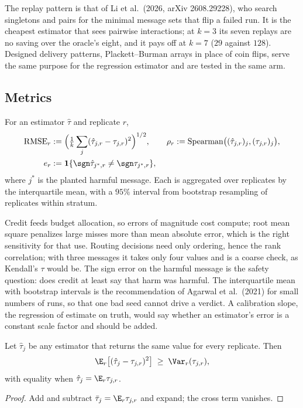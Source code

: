 \documentclass[11pt]{article}
\numberwithin{theorem}{section}
\theoremstyle{definition}
\theoremstyle{problemstyle}
\begin{document}
\begin{remark}
The replay pattern is that of Li et al.\ (2026, arXiv 2608.29228), who search singletons and pairs for the minimal
message sets that flip a failed run. It is the cheapest estimator that sees pairwise interactions; at $k=3$ its seven
replays are no saving over the oracle's eight, and it pays off at $k=7$ ($29$ against $128$). Designed delivery
patterns, Plackett--Burman arrays in place of coin flips, serve the same purpose for the regression estimator and are
tested in the same arm.
\end{remark}

\subsection{Metrics}

\begin{definition}
For an estimator $\hat\tau$ and replicate $r$,
\begin{align*}
\mathrm{RMSE}_r &:= \Big(\tfrac1k\sum_j(\hat\tau_{j,r}-\tau_{j,r})^2\Big)^{1/2}, \qquad
\rho_r := \mathrm{Spearman}\big((\hat\tau_{j,r})_j,(\tau_{j,r})_j\big),\\
e_r &:= \mathbf 1\{\sgn\hat\tau_{j^\ast,r}\neq\sgn\tau_{j^\ast,r}\},
\end{align*}
where $j^\ast$ is the planted harmful message. Each is aggregated over replicates by the interquartile mean, with a
$95\%$ interval from bootstrap resampling of replicates within stratum.
\end{definition}

\begin{remark}
Credit feeds budget allocation, so errors of magnitude cost compute; root mean square penalizes large misses more than
mean absolute error, which is the right sensitivity for that use. Routing decisions need only ordering, hence the rank
correlation; with three messages it takes only four values and is a coarse check, as Kendall's $\tau$ would be. The
sign error on the harmful message is the safety question: does credit at least say that harm was harmful. The
interquartile mean with bootstrap intervals is the recommendation of Agarwal et al.\ (2021) for small numbers of runs,
so that one bad seed cannot drive a verdict. A calibration slope, the regression of estimate on truth, would say whether
an estimator's error is a constant scale factor and should be added.
\end{remark}

\begin{prop}\label{prop:floor}
Let $\hat\tau_j$ be any estimator that returns the same value for every replicate. Then
\[
\E_r\big[(\hat\tau_j-\tau_{j,r})^2\big]\;\ge\;\Var_r(\tau_{j,r}),
\]
with equality when $\hat\tau_j=\E_r\tau_{j,r}$.
\end{prop}
\begin{proof}
Add and subtract $\bar\tau_j=\E_r\tau_{j,r}$ and expand; the cross term vanishes.
\end{proof}
\end{document}
